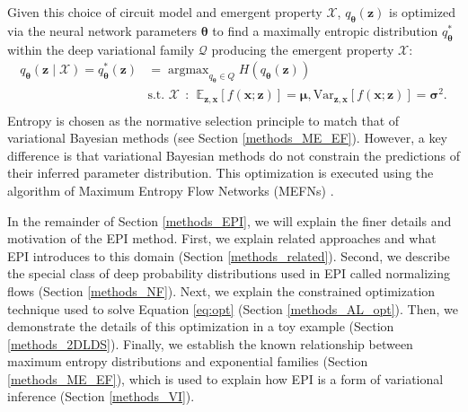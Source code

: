 \documentclass[11pt]{article}
\DeclareMathOperator*{\argmax}{argmax}
\begin{document}
Given this choice of circuit model and emergent property $\mathcal{X}$, $q_{\bm{\theta}}(\mathbf{z})$ is optimized via the neural network parameters $\bm{\theta}$ to find a maximally entropic distribution $q_{\bm{\theta}}^*$ within the deep variational family $\mathcal{Q}$ producing the emergent property $\mathcal{X}$:
\begin{equation} \label{eq:opt}
\begin{split}
q_{\bm{\theta}}(\mathbf{z} \mid \mathcal{X}) = q_{\bm{\theta}}^*(\mathbf{z}) &= \argmax_{q_{\bm{\theta}} \in Q} H(q_{\bm{\theta}}(\mathbf{z})) \\
 &  \text{s.t.  } \mathcal{X} ~~:~~ \mathbb{E}_{\mathbf{z},\mathbf{x}}\left[f(\mathbf{x}; \mathbf{z})\right] = \bm{\mu}, \text{Var}_{\mathbf{z},\mathbf{x}}\left[f(\mathbf{x}; \mathbf{z})\right] = \bm{\sigma}^2. \\
 \end{split}
\end{equation} 
Entropy is chosen as the normative selection principle to match that of variational Bayesian methods (see Section \ref{methods_ME_EF}).
However, a key difference is that variational Bayesian methods do not constrain the predictions of their inferred parameter distribution.
This optimization is executed using the algorithm of Maximum Entropy Flow Networks (MEFNs) \cite{loaiza2017maximum}.


In the remainder of Section \ref{methods_EPI}, we will explain the finer details and motivation of the EPI method. 
First, we explain related approaches and what EPI introduces to this domain (Section \ref{methods_related}).
Second, we describe the special class of deep probability distributions used in EPI called normalizing flows (Section \ref{methods_NF}).  
Next, we explain the constrained optimization technique used to solve Equation \ref{eq:opt} (Section \ref{methods_AL_opt}).
Then, we demonstrate the details of this optimization in a toy example (Section \ref{methods_2DLDS}).
Finally, we establish the known relationship between maximum entropy distributions and exponential families (Section \ref{methods_ME_EF}), which is used to explain how EPI is a form of variational inference (Section \ref{methods_VI}).
\end{document}
